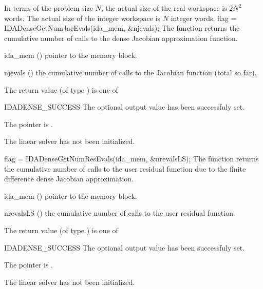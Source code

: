 {{  
  In terms of the problem size $N$, the actual size of the real workspace
  is $2N^2$  words.
  The actual size of the integer workspace is $N$ integer words.
}
{
  flag = IDADenseGetNumJacEvals(ida\_mem, \&njevals);
}
{
  The function  returns the
  cumulative number of calls to the dense Jacobian approximation function.
}
{
  \begin{args}[njevals]
  \item[ida\_mem] ()
    pointer to the {\ida} memory block.
  \item[njevals] ()
    the cumulative number of calls to the Jacobian function (total so far).
  \end{args}
}
{
  The return value  (of type ) is one of
  \begin{args}
  \item[IDADENSE\_SUCCESS] 
    The optional output value has been successfuly set.
  \item[\Id{IDADENSE\_MEM\_NULL}]
    The  pointer is .
  \item[\Id{IDADENSE\_LMEM\_NULL}]
    The {\idadense} linear solver has not been initialized.
  \end{args}
}
{}
{
  flag = IDADenseGetNumResEvals(ida\_mem, \&nrevalsLS);
}
{
  The function  returns the
  cumulative number of calls to the user residual function due to the 
  finite difference dense Jacobian approximation.
}
{
  \begin{args}[nrevalsLS]
  \item[ida\_mem] ()
    pointer to the {\ida} memory block.
  \item[nrevalsLS] ()
    the cumulative number of calls to the user residual function.
  \end{args}
}
{
  The return value  (of type ) is one of
  \begin{args}
  \item[IDADENSE\_SUCCESS] 
    The optional output value has been successfuly set.
  \item[\Id{IDADENSE\_MEM\_NULL}]
    The  pointer is .
  \item[\Id{IDADENSE\_LMEM\_NULL}]
    The {\idadense} linear solver has not been initialized.
  \end{args}
}}
